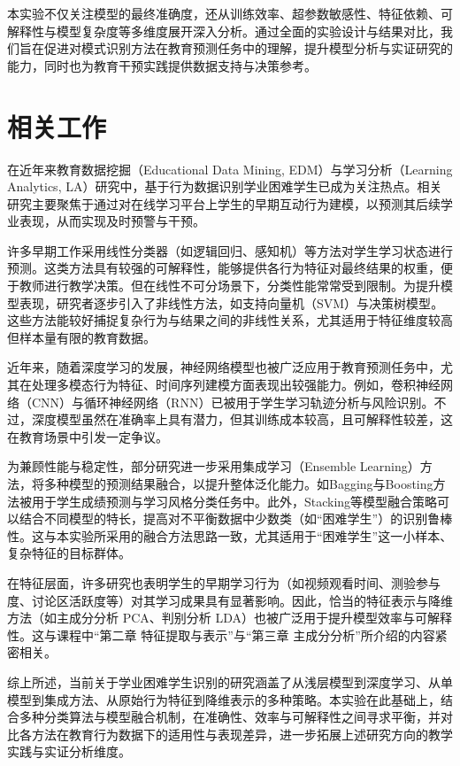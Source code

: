 \documentclass[a4paper, utf8]{ctexart}
\begin{document}
	本实验不仅关注模型的最终准确度，还从训练效率、超参数敏感性、特征依赖、可解释性与模型复杂度等多维度展开深入分析。通过全面的实验设计与结果对比，我们旨在促进对模式识别方法在教育预测任务中的理解，提升模型分析与实证研究的能力，同时也为教育干预实践提供数据支持与决策参考。
	
	\section{相关工作}
	
	在近年来教育数据挖掘（Educational Data Mining, EDM）与学习分析（Learning Analytics, LA）研究中，基于行为数据识别学业困难学生已成为关注热点\cite{ref5,ref18,ref20}。相关研究主要聚焦于通过对在线学习平台上学生的早期互动行为建模，以预测其后续学业表现，从而实现及时预警与干预\cite{ref14,ref26}。
	
	许多早期工作采用线性分类器（如逻辑回归、感知机）等方法对学生学习状态进行预测\cite{ref13,ref19}。这类方法具有较强的可解释性，能够提供各行为特征对最终结果的权重，便于教师进行教学决策。但在线性不可分场景下，分类性能常常受到限制。为提升模型表现，研究者逐步引入了非线性方法，如支持向量机（SVM）与决策树模型\cite{ref7,ref23}。这些方法能较好捕捉复杂行为与结果之间的非线性关系，尤其适用于特征维度较高但样本量有限的教育数据\cite{ref16}。
	
	近年来，随着深度学习的发展，神经网络模型也被广泛应用于教育预测任务中，尤其在处理多模态行为特征、时间序列建模方面表现出较强能力\cite{ref4,ref11,ref22}。例如，卷积神经网络（CNN）与循环神经网络（RNN）已被用于学生学习轨迹分析与风险识别\cite{ref22}。不过，深度模型虽然在准确率上具有潜力，但其训练成本较高，且可解释性较差，这在教育场景中引发一定争议\cite{ref11}。
	
	为兼顾性能与稳定性，部分研究进一步采用集成学习（Ensemble Learning）方法，将多种模型的预测结果融合，以提升整体泛化能力\cite{ref6,ref9}。如Bagging与Boosting方法被用于学生成绩预测与学习风格分类任务中\cite{ref10,ref16}。此外，Stacking等模型融合策略可以结合不同模型的特长，提高对不平衡数据中少数类（如“困难学生”）的识别鲁棒性\cite{ref12,ref25}。这与本实验所采用的融合方法思路一致，尤其适用于“困难学生”这一小样本、复杂特征的目标群体。
	
	在特征层面，许多研究也表明学生的早期学习行为（如视频观看时间、测验参与度、讨论区活跃度等）对其学习成果具有显著影响\cite{ref14,ref15,ref24}。因此，恰当的特征表示与降维方法（如主成分分析 PCA、判别分析 LDA）也被广泛用于提升模型效率与可解释性\cite{ref3,ref19}。这与课程中“第二章 特征提取与表示”与“第三章 主成分分析”所介绍的内容紧密相关。
	
	综上所述，当前关于学业困难学生识别的研究涵盖了从浅层模型到深度学习、从单模型到集成方法、从原始行为特征到降维表示的多种策略。本实验在此基础上，结合多种分类算法与模型融合机制，在准确性、效率与可解释性之间寻求平衡，并对比各方法在教育行为数据下的适用性与表现差异，进一步拓展上述研究方向的教学实践与实证分析维度。
	
\end{document}
